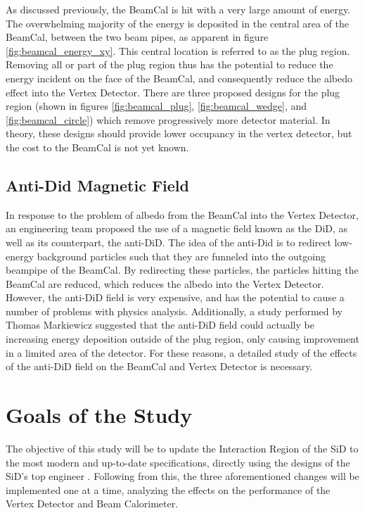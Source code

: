 \documentclass{report}
\begin{document}
                As discussed previously, the BeamCal is hit with a very large amount of energy. The overwhelming majority of the energy is deposited in the central area of the BeamCal, between the two beam pipes, as apparent in figure \ref{fig:beamcal_energy_xy}. This central location is referred to as the plug region. Removing all or part of the plug region thus has the potential to reduce the energy incident on the face of the BeamCal, and consequently reduce the albedo effect into the Vertex Detector. There are three proposed designs for the plug region (shown in figures \ref{fig:beamcal_plug}, \ref{fig:beamcal_wedge}, and \ref{fig:beamcal_circle}) which remove progressively more detector material. In theory, these designs should provide lower occupancy in the vertex detector, but the cost to the BeamCal is not yet known.


            \subsection{Anti-Did Magnetic Field}
                In response to the problem of albedo from the BeamCal into the Vertex Detector, an engineering team proposed the use of a magnetic field known as the DiD, as well as its counterpart, the anti-DiD. The idea of the anti-Did is to redirect low-energy background particles such that they are funneled into the outgoing beampipe of the BeamCal. By redirecting these particles, the particles hitting the BeamCal are reduced, which reduces the albedo into the Vertex Detector. However, the anti-DiD field is very expensive, and has the potential to cause a number of problems with physics analysis. Additionally, a study performed by Thomas Markiewicz \cite{anti-did} suggested that the anti-DiD field could actually be increasing energy deposition outside of the plug region, only causing improvement in a limited area of the detector. For these reasons, a detailed study of the effects of the anti-DiD field on the BeamCal and Vertex Detector is necessary.


        \section{Goals of the Study} %
            The objective of this study will be to update the Interaction Region of the SiD to the most modern and up-to-date specifications, directly using the designs of the SiD's top engineer \cite{excel}. Following from this, the three aforementioned changes will be implemented one at a time, analyzing the effects on the performance of the Vertex Detector and Beam Calorimeter. 
\end{document}
